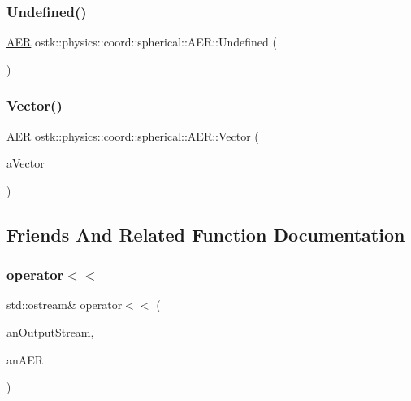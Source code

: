 \subsubsection{\texorpdfstring{Undefined()}{Undefined()}}
{\footnotesize\ttfamily \hyperlink{classostk_1_1physics_1_1coord_1_1spherical_1_1_a_e_r}{A\+ER} ostk\+::physics\+::coord\+::spherical\+::\+A\+E\+R\+::\+Undefined (\begin{DoxyParamCaption}{ }\end{DoxyParamCaption})\hspace{0.3cm}{\ttfamily [static]}}

\mbox{\label{classostk_1_1physics_1_1coord_1_1spherical_1_1_a_e_r_a9d843e5e09faec5bfdd0b333b5380778}} 
\subsubsection{\texorpdfstring{Vector()}{Vector()}}
{\footnotesize\ttfamily \hyperlink{classostk_1_1physics_1_1coord_1_1spherical_1_1_a_e_r}{A\+ER} ostk\+::physics\+::coord\+::spherical\+::\+A\+E\+R\+::\+Vector (\begin{DoxyParamCaption}\item[{const Vector3d \&}]{a\+Vector }\end{DoxyParamCaption})\hspace{0.3cm}{\ttfamily [static]}}



\subsection{Friends And Related Function Documentation}
\mbox{\label{classostk_1_1physics_1_1coord_1_1spherical_1_1_a_e_r_ac5514fc65bf0bd3f4f5870b246cff3ad}} 
\subsubsection{\texorpdfstring{operator$<$$<$}{operator<<}}
{\footnotesize\ttfamily std\+::ostream\& operator$<$$<$ (\begin{DoxyParamCaption}\item[{std\+::ostream \&}]{an\+Output\+Stream,  }\item[{const \hyperlink{classostk_1_1physics_1_1coord_1_1spherical_1_1_a_e_r}{A\+ER} \&}]{an\+A\+ER }\end{DoxyParamCaption})\hspace{0.3cm}{\ttfamily [friend]}}



